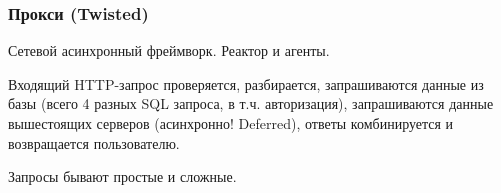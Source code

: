 \begin{frame}
  \frametitle{Прокси (Twisted)}

  Сетевой асинхронный фреймворк.  Реактор и агенты.

  Входящий HTTP-запрос проверяется, разбирается, запрашиваются данные
  из базы (всего 4 разных SQL запроса, в т.ч. авторизация),
  запрашиваются данные вышестоящих серверов (асинхронно! Deferred),
  ответы комбинируется и возвращается пользователю.

  Запросы бывают простые и сложные.
\end{frame}
